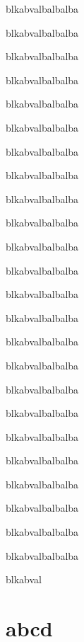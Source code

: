 \documentclass{../Vorlage/mat}
\begin{document}
blkabvalbalbalba

blkabvalbalbalba

blkabvalbalbalba

blkabvalbalbalba

blkabvalbalbalba

blkabvalbalbalba

blkabvalbalbalba

blkabvalbalbalba

blkabvalbalbalba

blkabvalbalbalba

blkabvalbalbalba

blkabvalbalbalba

blkabvalbalbalba

blkabvalbalbalba

blkabvalbalbalba

blkabvalbalbalba

blkabvalbalbalba

blkabvalbalbalba

blkabvalbalbalba

blkabvalbalbalba

blkabvalbalbalba

blkabvalbalbalba

blkabvalbalbalba

blkabvalbalbalba

blkabval
\section{abcd}
\end{document}
